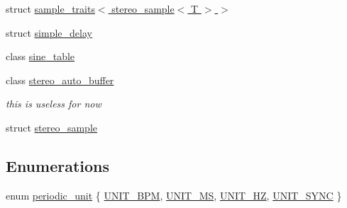 \begin{DoxyCompactItemize}
\item 
struct \hyperlink{structdsp_1_1sample__traits_3_01stereo__sample_3_01_t_01_4_01_4}{sample\+\_\+traits$<$ stereo\+\_\+sample$<$ T $>$ $>$}
\item 
struct \hyperlink{structdsp_1_1simple__delay}{simple\+\_\+delay}
\item 
class \hyperlink{classdsp_1_1sine__table}{sine\+\_\+table}
\item 
class \hyperlink{classdsp_1_1stereo__auto__buffer}{stereo\+\_\+auto\+\_\+buffer}
\begin{DoxyCompactList}\small\item\em this is useless for now \end{DoxyCompactList}\item 
struct \hyperlink{structdsp_1_1stereo__sample}{stereo\+\_\+sample}
\end{DoxyCompactItemize}
\subsection*{Enumerations}
\begin{DoxyCompactItemize}
\item 
enum \hyperlink{namespacedsp_a62db0a3af67183c65a28083fe474f349}{periodic\+\_\+unit} \{ \hyperlink{namespacedsp_a62db0a3af67183c65a28083fe474f349aae85e1b64cbabef303dac5d03031faa3}{U\+N\+I\+T\+\_\+\+B\+PM}, 
\hyperlink{namespacedsp_a62db0a3af67183c65a28083fe474f349a564f5f239715b21f1e19ea21527b86d5}{U\+N\+I\+T\+\_\+\+MS}, 
\hyperlink{namespacedsp_a62db0a3af67183c65a28083fe474f349a29ff6f09e74c392cd598fdb0ba4cc0f9}{U\+N\+I\+T\+\_\+\+HZ}, 
\hyperlink{namespacedsp_a62db0a3af67183c65a28083fe474f349a5141d8f56fb022a26383c50f6319819e}{U\+N\+I\+T\+\_\+\+S\+Y\+NC}
 \}
\end{DoxyCompactItemize}

